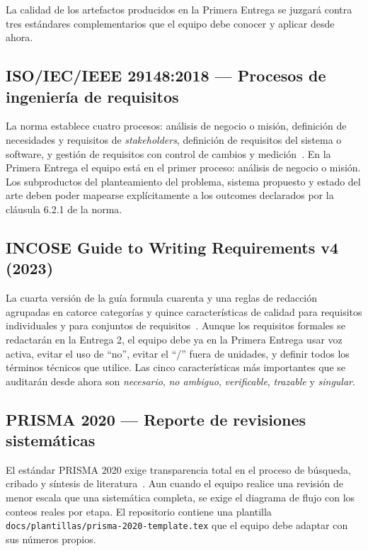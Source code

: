 \documentclass[11pt,a4paper]{article}
\begin{document}
La calidad de los artefactos producidos en la Primera Entrega se juzgar\'a contra tres est\'andares complementarios que el equipo debe conocer y aplicar desde ahora.

\subsection{ISO/IEC/IEEE 29148:2018 --- Procesos de ingenier\'ia de requisitos}

La norma establece cuatro procesos: an\'alisis de negocio o misi\'on, definici\'on de necesidades y requisitos de \emph{stakeholders}, definici\'on de requisitos del sistema o software, y gesti\'on de requisitos con control de cambios y medici\'on~\cite{iso29148}. En la Primera Entrega el equipo est\'a en el primer proceso: an\'alisis de negocio o misi\'on. Los subproductos del planteamiento del problema, sistema propuesto y estado del arte deben poder mapearse expl\'icitamente a los outcomes declarados por la cl\'ausula 6.2.1 de la norma.

\subsection{INCOSE Guide to Writing Requirements v4 (2023)}

La cuarta versi\'on de la gu\'ia formula cuarenta y una reglas de redacci\'on agrupadas en catorce categor\'ias y quince caracter\'isticas de calidad para requisitos individuales y para conjuntos de requisitos~\cite{incose2023requirements}. Aunque los requisitos formales se redactar\'an en la Entrega 2, el equipo debe ya en la Primera Entrega usar voz activa, evitar el uso de ``no'', evitar el ``/'' fuera de unidades, y definir todos los t\'erminos t\'ecnicos que utilice. Las cinco caracter\'isticas m\'as importantes que se auditar\'an desde ahora son \emph{necesario}, \emph{no ambiguo}, \emph{verificable}, \emph{trazable} y \emph{singular}.

\subsection{PRISMA 2020 --- Reporte de revisiones sistem\'aticas}

El est\'andar PRISMA 2020 exige transparencia total en el proceso de b\'usqueda, cribado y s\'intesis de literatura~\cite{page2021prisma}. Aun cuando el equipo realice una revisi\'on de menor escala que una sistem\'atica completa, se exige el diagrama de flujo con los conteos reales por etapa. El repositorio contiene una plantilla \texttt{docs/plantillas/prisma-2020-template.tex} que el equipo debe adaptar con sus n\'umeros propios.
\end{document}
